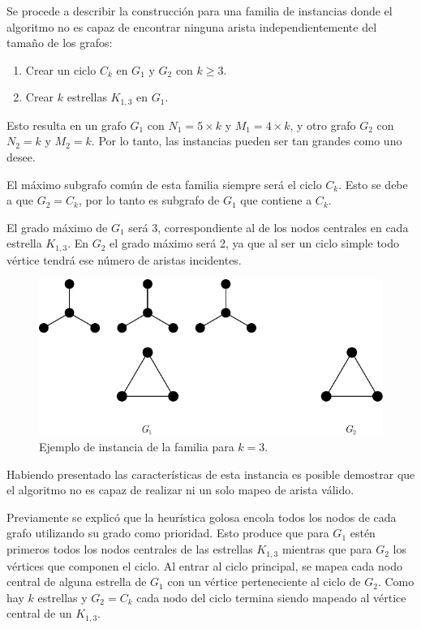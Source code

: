 Se procede a describir la construcción para una familia de instancias donde el
algoritmo no es capaz de encontrar ninguna arista independientemente del tamaño
de los grafos:

\begin{enumerate}
	\item Crear un ciclo $C_k$ en $G_1$ y $G_2$ con $k \geq 3$.
	\item Crear $k$ estrellas $K_{1,3}$ en $G_1$.
\end{enumerate}

Esto resulta en un grafo $G_1$ con $N_1 = 5 \times k$ y $M_1 = 4 \times k$,
y otro grafo $G_2$ con $N_2 = k$ y $M_2 = k$. Por lo tanto, las instancias
pueden ser tan grandes como uno desee.

El máximo subgrafo común de esta familia siempre será el ciclo $C_k$. Esto se
debe a que $G_2 = C_k$, por lo tanto es subgrafo de $G_1$ que contiene a $C_k$.

El grado máximo de $G_1$ será 3, correspondiente al de los nodos
centrales en cada estrella $K_{1,3}$. En $G_2$ el grado máximo será 2, ya que al
ser un ciclo simple todo vértice tendrá ese número de aristas incidentes.

\begin{figure}[H]
	\centering
	\includegraphics{imagenes/ex4.pdf}
	\caption{Ejemplo de instancia de la familia para $k = 3$.}
	\label{fig:heuristica-golosa:ejemplo-g1-suboptimo}
\end{figure}

Habiendo presentado las características de esta instancia es posible demostrar
que el algoritmo no es capaz de realizar ni un solo mapeo de arista válido.

Previamente se explicó que la heurística golosa encola todos los nodos de cada
grafo utilizando su grado como prioridad. Esto produce que para $G_1$ estén
primeros todos los nodos centrales de las estrellas $K_{1,3}$ mientras que para
$G_2$ los vértices que componen el ciclo. Al entrar al ciclo principal, se mapea
cada nodo central de alguna estrella de $G_1$ con un vértice perteneciente al
ciclo de $G_2$. Como hay $k$ estrellas y $G_2 = C_k$ cada nodo del ciclo
termina siendo mapeado al vértice central de un $K_{1,3}$.

